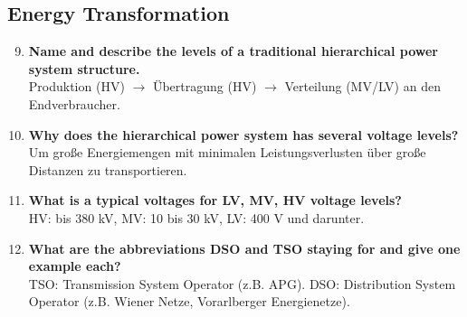 \documentclass{article}
\begin{document}
\subsection*{Energy Transformation}
\begin{enumerate}
    \setcounter{enumi}{8}
    \item \textbf{Name and describe the levels of a traditional hierarchical power system structure.} \\
    Produktion (HV) $\rightarrow$ Übertragung (HV) $\rightarrow$ Verteilung (MV/LV) an den Endverbraucher.
    \item \textbf{Why does the hierarchical power system has several voltage levels?} \\
    Um große Energiemengen mit minimalen Leistungsverlusten über große Distanzen zu transportieren.
    \item \textbf{What is a typical voltages for LV, MV, HV voltage levels?} \\
    HV: bis 380 kV, MV: 10 bis 30 kV, LV: 400 V und darunter.
    \item \textbf{What are the abbreviations DSO and TSO staying for and give one example each?} \\
    TSO: Transmission System Operator (z.B. APG). DSO: Distribution System Operator (z.B. Wiener Netze, Vorarlberger Energienetze).
\end{enumerate}
\end{document}
